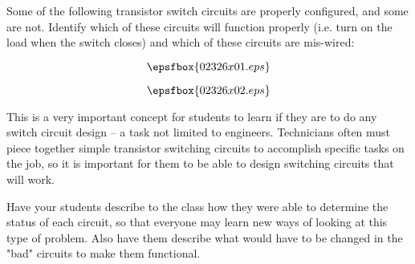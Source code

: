 

Some of the following transistor switch circuits are properly configured, and some are not.  Identify which of these circuits will function properly (i.e. turn on the load when the switch closes) and which of these circuits are mis-wired:

$$\epsfbox{02326x01.eps}$$







$$\epsfbox{02326x02.eps}$$







This is a very important concept for students to learn if they are to do any switch circuit design -- a task not limited to engineers.  Technicians often must piece together simple transistor switching circuits to accomplish specific tasks on the job, so it is important for them to be able to design switching circuits that will work.

Have your students describe to the class how they were able to determine the status of each circuit, so that everyone may learn new ways of looking at this type of problem.  Also have them describe what would have to be changed in the "bad" circuits to make them functional.




